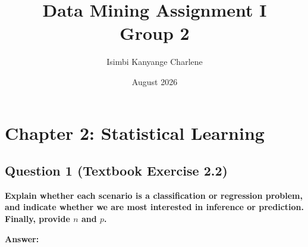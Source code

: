 \documentclass[12pt,a4paper]{article}
\title{\textbf{Data Mining Assignment I}\\[0.5em]Group 2}
\author{Isimbi Kanyange Charlene}
\date{August 2026}
\begin{document}
\maketitle
\newpage

\section*{Chapter 2: Statistical Learning}

\subsection*{Question 1 (Textbook Exercise 2.2)}

\textbf{Explain whether each scenario is a classification or regression problem, and indicate whether we are most interested in inference or prediction. Finally, provide $n$ and $p$.}

\textbf{Answer:}
\end{document}
